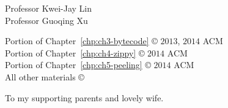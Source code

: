 



\othercommitteemembers
{
  Professor Kwei-Jay Lin\\
  Professor Guoqing Xu
}


\copyrightdeclaration
{
  Portion of Chapter~\ref{chp:ch3-bytecode} {\copyright} $2013$, $2014$ ACM \\
  Portion of Chapter~\ref{chp:ch4-zippy} {\copyright} $2014$ ACM \\
  Portion of Chapter~\ref{chp:ch5-peeling} {\copyright} $2014$ ACM \\
  All other materials {\copyright} {\Degreeyear} \Authorname
}


\dedications
{

  To my supporting parents and lovely wife.
}

